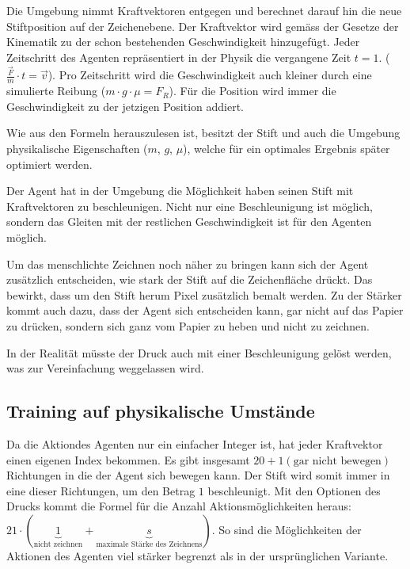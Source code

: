 Die Umgebung nimmt Kraftvektoren entgegen und berechnet darauf hin die neue
Stiftposition auf der Zeichenebene. Der Kraftvektor wird gemäss der Gesetze der
Kinematik zu der schon bestehenden Geschwindigkeit hinzugefügt. Jeder
Zeitschritt des Agenten repräsentiert in der Physik die vergangene Zeit $t=1$.
($\frac{\vec{F}}{m}\cdot t=\vec{v}$). Pro Zeitschritt wird die Geschwindigkeit
auch kleiner durch eine simulierte Reibung ($m\cdot g \cdot \mu = F_R$). Für die
Position wird immer die Geschwindigkeit zu der jetzigen Position addiert.

Wie aus den Formeln herauszulesen ist, besitzt der Stift und auch die Umgebung
physikalische Eigenschaften ($m$, $g$, $\mu$), welche für ein optimales Ergebnis
später optimiert werden.

Der Agent hat in der Umgebung die Möglichkeit haben seinen Stift mit
Kraftvektoren zu beschleunigen. Nicht nur eine Beschleunigung ist möglich,
sondern das Gleiten mit der restlichen Geschwindigkeit ist für den Agenten
möglich.

Um das menschlichte Zeichnen noch näher zu bringen kann sich der Agent
zusätzlich entscheiden, wie stark der Stift auf die Zeichenfläche drückt. Das
bewirkt, dass um den Stift herum Pixel zusätzlich bemalt werden. Zu der Stärker
kommt auch dazu, dass der Agent sich entscheiden kann, gar nicht auf das Papier
zu drücken, sondern sich ganz vom Papier zu heben und nicht zu zeichnen.

In der Realität müsste der Druck auch mit einer Beschleunigung gelöst werden,
was zur Vereinfachung weggelassen wird.

\subsection*{Training auf physikalische Umstände}

Da die Aktiondes Agenten nur ein einfacher Integer ist, hat jeder Kraftvektor
einen eigenen Index bekommen. Es gibt insgesamt $20 + 1 (\text{gar nicht
bewegen})$ Richtungen in die der Agent sich bewegen kann. Der Stift wird somit
immer in eine dieser Richtungen, um den Betrag $1$ beschleunigt. Mit den
Optionen des Drucks kommt die Formel für die Anzahl Aktionsmöglichkeiten heraus:
$21\cdot(\underbrace{1}_{\text{nicht zeichnen}} + \underbrace{s}_{\text{maximale
Stärke des Zeichnens}})$. So sind die Möglichkeiten der Aktionen des Agenten
viel stärker begrenzt als in der ursprünglichen Variante.

